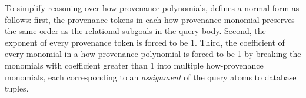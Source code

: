 

To simplify reasoning over how-provenance polynomials, \cite{amsterdamer2012provenance} defines a normal form as follows: first, the provenance tokens in each how-provenance monomial preserves the same order as the relational subgoals in the query body. Second, the exponent of every provenance token is forced to be 1. Third, the coefficient of every monomial in a how-provenance polynomial is forced to be 1 by breaking the monomials with coefficient greater than 1 into multiple how-provenance monomials, each corresponding to an {\em assignment} of the query atoms to database tuples.
